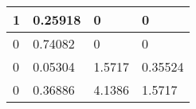 \begin{tabular}{|l|l|l|l|}
\hline
1&0.25918&0&0\\\hline
0&0.74082&0&0\\\hline
0&0.05304&1.5717&0.35524\\\hline
0&0.36886&4.1386&1.5717\\\hline
\end{tabular}

